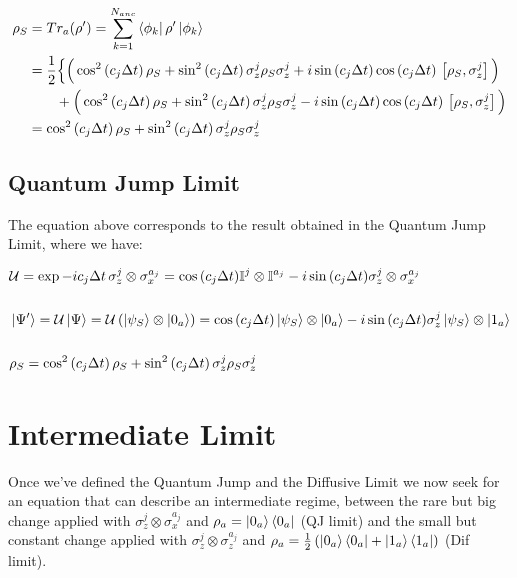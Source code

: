 \documentclass[a4paper,12pt]{article}
\begin{document}
	\begin{align}
		\rho_S & = Tr_a(\rho') = \sum_{k=1}^{N_{anc}}{\bra{\phi_k}\rho'\ket{\phi_k}} \notag \\
		&= \frac{1}{2} \Big\{ \Big( \cos^{2}{\left( c_j \Delta t \right)} \, \rho_S + \sin^{2}{\left( c_j \Delta t \right)} \, \sigma_{z}^{j}\rho_S\sigma_{z}^{j} 
		+i \sin{\left( c_j \Delta t \right)}\cos{\left( c_j \Delta t \right)} \, \left[ \rho_S, \sigma_{z}^{j} \right] \Big) \notag \\
		& \qquad  + \Big( \cos^{2}{\left( c_j \Delta t \right)} \, \rho_S + \sin^{2}{\left( c_j \Delta t \right)} \, \sigma_{z}^{j}\rho_S\sigma_{z}^{j} 
		-i \sin{\left( c_j \Delta t \right)}\cos{\left( c_j \Delta t \right)} \, \left[ \rho_S, \sigma_{z}^{j} \right] \Big) \notag \\
		& =	\cos^{2}{\left( c_j \Delta t \right)} \, \rho_S + \sin^{2}{\left( c_j \Delta t \right)} \, \sigma_{z}^{j}\rho_S\sigma_{z}^{j} 
	\end{align}	
	
	\subsection{Quantum Jump Limit}
	
		The equation above corresponds to the result obtained in the Quantum Jump Limit, where we have:

	\begin{align}
		&\mathcal{U} = \exp{-i c_{j} \Delta t \, \sigma_{z}^{j} \otimes \sigma_{x}^{a_j}} = \cos{\left(c_{j}\Delta t\right)} \mathbb{I}^{j} \otimes \mathbb{I}^{a_j} - i \sin{\left(c_{j}\Delta t\right)} \sigma_{z}^{j} \otimes \sigma_{x}^{a_j}\\
		\notag \\
		&\ket{\Psi'} = \mathcal{U} \ket{\Psi} = \mathcal{U} \left( \ket{\psi_S} \otimes \ket{0_a} \right) = \cos{\left(c_{j}\Delta t\right)} \ket{\psi_S} \otimes \ket{0_a} - i \sin{\left(c_{j}\Delta t\right)} \sigma_{z}^{j}  \ket{\psi_S} \otimes\ket{1_a} \\
		\notag \\
		&\rho_S = \cos^{2}{\left( c_j \Delta t \right)} \, \rho_S + \sin^{2}{\left( c_j \Delta t \right)} \, \sigma_{z}^{j}\rho_S\sigma_{z}^{j}
	\end{align}
	
	\clearpage
	\newpage
	
	\section{Intermediate Limit}
	Once we've defined the Quantum Jump and the Diffusive Limit we now seek for an equation that can describe an intermediate regime, between the rare but big change applied with $ \sigma_{z}^{j} \otimes \sigma_{x}^{a_j} $ and $ \rho_a = \ket{0_a}\bra{0_a} $ (QJ limit) and the small but constant change applied with $ \sigma_{z}^{j} \otimes \sigma_{z}^{a_j} $ and $ \rho_a = \frac{1}{2} \left( \ket{0_a}\bra{0_a} + \ket{1_a}\bra{1_a} \right) $ (Dif limit).
	
\end{document}
